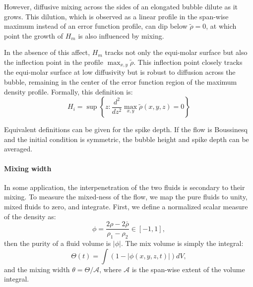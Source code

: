 However, diffusive mixing across the sides of an elongated bubble dilute as it grows.
This dilution, which is observed as a linear profile in the span-wise maximum instead of an error function profile, can dip below $\tilde\rho = 0$, at which point the growth of $H_m$ is also influenced by mixing.

In the absence of this affect, $H_{m}$ tracks not only the equi-molar surface but also the inflection point in the profile $\max_{x,y} \tilde \rho$.
This inflection point closely tracks the equi-molar surface at low diffusivity but is robust to diffusion across the bubble, remaining in the center of the error function region of the maximum density profile.
Formally, this definition is:
\begin{equation}
H_i = \sup \left\{z : \frac{d^2}{dz^2} \max_{x,y} \tilde\rho(x,y,z) = 0 \right\}
\end{equation}

Equivalent definitions can be given for the spike depth.
If the flow is Boussinesq and the initial condition is symmetric, the bubble height and spike depth can be averaged.

\paragraph{Mixing width}

In some application, the interpenetration of the two fluids is secondary to their mixing.
To measure the mixed-ness of the flow, we map the pure fluids to unity, mixed fluids to zero, and integrate.
First, we define a normalized scalar measure of the density as:
\begin{equation}
\phi = \frac{2\rho - 2\bar\rho}{\rho_1 - \rho_2} \in \left[-1,1\right],
\end{equation}
then the purity of a fluid volume is $|\phi|$.
The mix volume is simply the integral:
\begin{equation}
\Theta(t) = \int \left(1 - \left|\phi(x,y,z,t)\right|\right) dV,
\end{equation}
and the mixing width $\theta = \Theta / \mathcal{A}$, where $\mathcal{A}$ is the span-wise extent of the volume integral.

